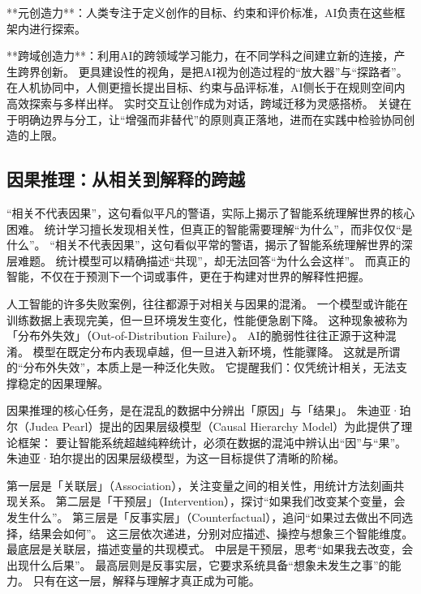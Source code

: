 **元创造力**：人类专注于定义创作的目标、约束和评价标准，AI负责在这些框架内进行探索。

**跨域创造力**：利用AI的跨领域学习能力，在不同学科之间建立新的连接，产生跨界创新。
更具建设性的视角，是把AI视为创造过程的“放大器”与“探路者”。
在人机协同中，人侧更擅长提出目标、约束与品评标准，AI侧长于在规则空间内高效探索与多样出样。
实时交互让创作成为对话，跨域迁移为灵感搭桥。
关键在于明确边界与分工，让“增强而非替代”的原则真正落地，进而在实践中检验协同创造的上限。

\subsection{因果推理：从相关到解释的跨越}

“相关不代表因果”，这句看似平凡的警语，实际上揭示了智能系统理解世界的核心困难。
统计学习擅长发现相关性，但真正的智能需要理解“为什么”，而非仅仅“是什么”。
“相关不代表因果”，这句看似平常的警语，揭示了智能系统理解世界的深层难题。
统计模型可以精确描述“共现”，却无法回答“为什么会这样”。
而真正的智能，不仅在于预测下一个词或事件，更在于构建对世界的解释性把握。

人工智能的许多失败案例，往往都源于对相关与因果的混淆。
一个模型或许能在训练数据上表现完美，但一旦环境发生变化，性能便急剧下降。
这种现象被称为「分布外失效」（Out-of-Distribution Failure）。
AI的脆弱性往往正源于这种混淆。
模型在既定分布内表现卓越，但一旦进入新环境，性能骤降。
这就是所谓的“分布外失效”，本质上是一种泛化失败。
它提醒我们：仅凭统计相关，无法支撑稳定的因果理解。

因果推理的核心任务，是在混乱的数据中分辨出「原因」与「结果」。
朱迪亚·珀尔（Judea Pearl）提出的因果层级模型（Causal Hierarchy Model）为此提供了理论框架：
要让智能系统超越纯粹统计，必须在数据的混沌中辨认出“因”与“果”。
朱迪亚·珀尔提出的因果层级模型，为这一目标提供了清晰的阶梯。

第一层是「关联层」（Association），关注变量之间的相关性，用统计方法刻画共现关系。  
第二层是「干预层」（Intervention），探讨“如果我们改变某个变量，会发生什么”。  
第三层是「反事实层」（Counterfactual），追问“如果过去做出不同选择，结果会如何”。  
这三层依次递进，分别对应描述、操控与想象三个智能维度。
最底层是关联层，描述变量的共现模式。
中层是干预层，思考“如果我去改变，会出现什么后果”。
最高层则是反事实层，它要求系统具备“想象未发生之事”的能力。
只有在这一层，解释与理解才真正成为可能。

